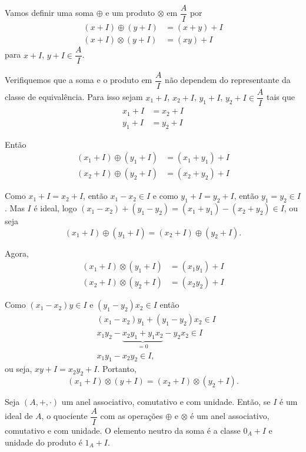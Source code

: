 Vamos definir uma soma $\oplus$ e um produto $\otimes$ em $\dfrac{A}{I}$ por
\begin{align*}
	(x + I)\oplus(y + I) &= (x + y) + I\\
	(x + I)\otimes(y + I) &= (xy) + I
\end{align*}
para $x + I$, $y + I \in \dfrac{A}{I}$.

Verifiquemos que a soma e o produto em $\dfrac{A}{I}$ n{\~a}o dependem do representante da classe de equival{\^e}ncia.
Para isso sejam $x_1 + I$, $x_2 + I$, $y_1 + I$, $y_2 + I \in \dfrac{A}{I}$ tais que
\begin{align*}
	x_1 + I &= x_2 + I\\
	y_1 + I &= y_2 + I	
\end{align*}

Ent{\~a}o
\begin{align*}
	(x_1 + I) \oplus (y_1 + I) &= (x_1 + y_1) + I\\
	(x_2 + I) \oplus (y_2 + I) &= (x_2 + y_2) + I
\end{align*}

Como $x_1 + I = x_2 + I$, ent{\~a}o $x_1 - x_2 \in I$ e como $y_1 + I = y_2 + I$, ent{\~a}o $y_1 = y_2 \in I$. Mas $I$ {\'e} ideal, logo $(x_1 - x_2) + (y_1 - y_2) = (x_1 + y_1) - (x_2 + y_2) \in I$, ou seja
\[
	(x_1 + I) \oplus (y_1 + I) = (x_2 + I) \oplus (y_2 + I).
\]

Agora,
\begin{align*}
	(x_1 + I) \otimes (y_1 + I) &= (x_1y_1) + I\\
	(x_2 + I) \otimes (y_2 + I) &= (x_2y_2) + I
\end{align*}

Como $(x_1 - x_2)y \in I$ e $(y_1 - y_2)x_2 \in I$ ent\~ao
\begin{align*}
	&(x_1 - x_2)y_1 + (y_1 - y_2)x_2 \in I\\
	&x_1y_2-\underbrace{x_2y_1 + y_1x_2}_{= 0} - y_2x_2 \in I\\
	&x_1y_1 - x_2y_2\in I,
\end{align*}
ou seja, $xy + I = x_2y_2 + I$. Portanto,
\[
	(x_1 + I) \otimes (y + I) = (x_2 + I) \otimes (y_2 + I).
\]

\begin{teorema}
	Seja $(A, +, \cdot)$ um anel associativo, comutativo e com unidade. Ent{\~a}o, se $I$ {\'e} um ideal de $A$,
	o quociente $\dfrac{A}{I}$ com as opera{\c c}{\~o}es $\oplus$ e $\otimes$ {\'e} um anel associativo,
	comutativo e com unidade. O elemento neutro da soma {\'e} a classe $0_{A} + I$ e unidade do produto {\'e} $1_{A} + I$.
\end{teorema}